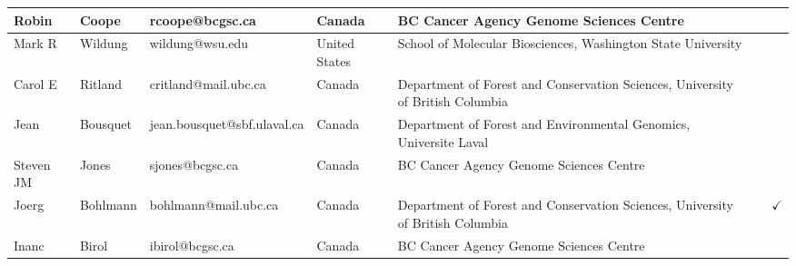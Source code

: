 {{\begin{tabular}{|l|l|l|l|p{5cm}|l|l|}
Robin               & Coope              & rcoope@bcgsc.ca             & Canada           & BC Cancer Agency Genome Sciences Centre                                        &                     &                         \\ \hline
Mark R              & Wildung            & wildung@wsu.edu             & United States    & School of Molecular Biosciences, Washington State University                   &                     &                         \\ \hline
Carol E             & Ritland            & critland@mail.ubc.ca        & Canada           & Department of Forest and Conservation Sciences, University of British Columbia &                     &                         \\ \hline
Jean                & Bousquet           & jean.bousquet@sbf.ulaval.ca & Canada           & Department of Forest and Environmental Genomics, Universite Laval              &                     &                         \\ \hline
Steven JM           & Jones              & sjones@bcgsc.ca             & Canada           & BC Cancer Agency Genome Sciences Centre                                        &                     &                         \\ \hline
Joerg               & Bohlmann           & bohlmann@mail.ubc.ca        & Canada           & Department of Forest and Conservation Sciences, University of British Columbia &                     & $\checkmark$                       \\ \hline
Inanc               & Birol              & ibirol@bcgsc.ca             & Canada           & BC Cancer Agency Genome Sciences Centre                                        &                     &                         \\ \hline
\end{tabular}%
}
}


